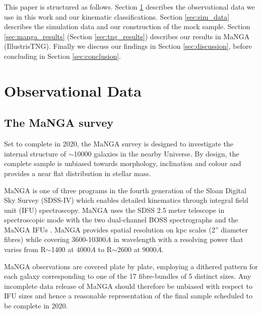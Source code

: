\documentclass[fleqn,usenatbib]{mnras}
\begin{document}
This paper is structured as follows. Section \ref{sec:obs_data} describes the observational data we use in this work and our kinematic classifications. Section \ref{sec:sim_data} describes the simulation data and our construction of the mock sample. Section \ref{sec:manga_results} (Section \ref{sec:tng_results}) describes our results in MaNGA (IllustrisTNG). Finally we discuss our findings in Section \ref{sec:discussion}, before concluding in Section \ref{sec:conclusion}.

\section{Observational Data} \label{sec:obs_data}
\subsection{The MaNGA survey}
Set to complete in 2020, the MaNGA survey is designed to investigate the internal structure of $\sim$10000 galaxies in the nearby Universe. By design, the complete sample is unbiased towards morphology, inclination and colour and provides a near flat distribution in stellar mass. 

MaNGA is one of three programs in the fourth generation of the Sloan Digital Sky Survey (SDSS-IV) which enables detailed kinematics through integral field unit (IFU) spectroscopy. MaNGA uses the SDSS 2.5 meter telescope in spectroscopic mode \citep{gunn2006} with the two dual-channel BOSS spectrographs \citep{smee2013} and the MaNGA IFUs \citep{drory2015}. MaNGA provides spatial resolution on kpc scales (2'' diameter fibres) while covering 3600-10300$\mathring{A}$ in wavelength with a resolving power that varies from R$\sim$1400 at 4000$\mathring{A}$ to R$\sim$2600 at 9000$\mathring{A}$. 

MaNGA observations are covered plate by plate, employing a dithered pattern for each galaxy corresponding to one of the 17 fibre-bundles of 5 distinct sizes. Any incomplete data release of MaNGA should therefore be unbiased with respect to IFU sizes and hence a reasonable representation of the final sample scheduled to be complete in 2020.
\end{document}
